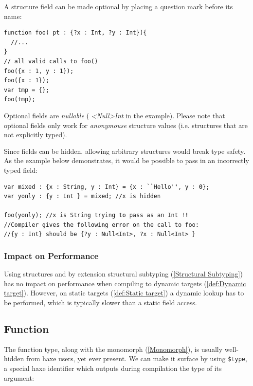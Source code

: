 \documentclass{article}
\newcommand{\expr}[1]{\texttt{#1}}
\newcommand{\tref}[2]{#1 (\ref{#2})}
\newcommand{\haxe}[2][]{%
}
\begin{document}
A structure field can be made optional by placing a question mark before its name:
\begin{lstlisting}
function foo( pt : {?x : Int, ?y : Int}){
  //...
}
// all valid calls to foo()
foo({x : 1, y : 1});
foo({x : 1});
var tmp = {};
foo(tmp);
\end{lstlisting}

Optional fields are \emph{nullable} (\emph{ \textless{}Null\textgreater Int} in the example).  Please note that optional fields only work for \emph{anonymouse} structure values (i.e. structures that are not explicitly typed).

Since fields can be hidden, allowing arbitrary structures would break type safety.  As the example below demonstrates, it would be possible to pass in an incorrectly typed field:

\begin{lstlisting}
var mixed : {x : String, y : Int} = {x : ``Hello'', y : 0};
var yonly : {y : Int } = mixed; //x is hidden

foo(yonly); //x is String trying to pass as an Int !!
//Compiler gives the following error on the call to foo:
//{y : Int} should be {?y : Null<Int>, ?x : Null<Int> }
\end{lstlisting} 


\subsubsection{Impact on Performance}
\label{Structure Impact on Performance}

Using structures and by extension \tref{structural subtyping}{Structural Subtyping} has no impact on performance when compiling to \tref{dynamic targets}{def:Dynamic target}. However, on \tref{static targets}{def:Static target} a dynamic lookup has to be performed, which is typically slower than a static field access.



\subsection{Function}
\label{Function}

The function type, along with the \tref{monomorph}{Monomorph}, is usually well-hidden from haxe users, yet ever present. We can make it surface by using \expr{\$type}, a special haxe identifier which outputs during compilation the type of its argument:

\haxe{assets/FunctionType.hx}
\end{document}
